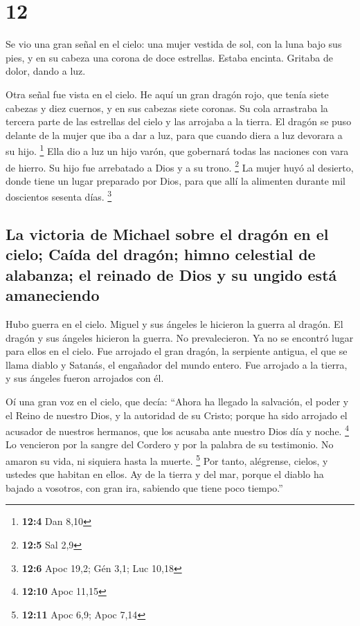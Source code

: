 \hypertarget{section-11}{%
\section{12}\label{section-11}}

 Se vio una gran señal en el cielo: una mujer vestida de
sol, con la luna bajo sus pies, y en su cabeza una corona de doce
estrellas.  Estaba encinta. Gritaba de dolor, dando a luz.

 Otra señal fue vista en el cielo. He aquí un gran dragón
rojo, que tenía siete cabezas y diez cuernos, y en sus cabezas siete
coronas.  Su cola arrastraba la tercera parte de las
estrellas del cielo y las arrojaba a la tierra. El dragón se puso
delante de la mujer que iba a dar a luz, para que cuando diera a luz
devorara a su hijo. \footnote{\textbf{12:4} Dan 8,10} 
Ella dio a luz un hijo varón, que gobernará todas las naciones con vara
de hierro. Su hijo fue arrebatado a Dios y a su trono. \footnote{\textbf{12:5}
  Sal 2,9}  La mujer huyó al desierto, donde tiene un
lugar preparado por Dios, para que allí la alimenten durante mil
doscientos sesenta días. \footnote{\textbf{12:6} Apoc 19,2; Gén 3,1; Luc
  10,18}

\hypertarget{la-victoria-de-michael-sobre-el-draguxf3n-en-el-cielo-cauxedda-del-draguxf3n-himno-celestial-de-alabanza-el-reinado-de-dios-y-su-ungido-estuxe1-amaneciendo}{%
\subsection{La victoria de Michael sobre el dragón en el cielo; Caída
del dragón; himno celestial de alabanza; el reinado de Dios y su ungido
está
amaneciendo}\label{la-victoria-de-michael-sobre-el-draguxf3n-en-el-cielo-cauxedda-del-draguxf3n-himno-celestial-de-alabanza-el-reinado-de-dios-y-su-ungido-estuxe1-amaneciendo}}

 Hubo guerra en el cielo. Miguel y sus ángeles le hicieron
la guerra al dragón. El dragón y sus ángeles hicieron la guerra.
 No prevalecieron. Ya no se encontró lugar para ellos en
el cielo.  Fue arrojado el gran dragón, la serpiente
antigua, el que se llama diablo y Satanás, el engañador del mundo
entero. Fue arrojado a la tierra, y sus ángeles fueron arrojados con él.

 Oí una gran voz en el cielo, que decía: ``Ahora ha
llegado la salvación, el poder y el Reino de nuestro Dios, y la
autoridad de su Cristo; porque ha sido arrojado el acusador de nuestros
hermanos, que los acusaba ante nuestro Dios día y noche. \footnote{\textbf{12:10}
  Apoc 11,15}  Lo vencieron por la sangre del Cordero y
por la palabra de su testimonio. No amaron su vida, ni siquiera hasta la
muerte. \footnote{\textbf{12:11} Apoc 6,9; Apoc 7,14} 
Por tanto, alégrense, cielos, y ustedes que habitan en ellos. Ay de la
tierra y del mar, porque el diablo ha bajado a vosotros, con gran ira,
sabiendo que tiene poco tiempo.''

